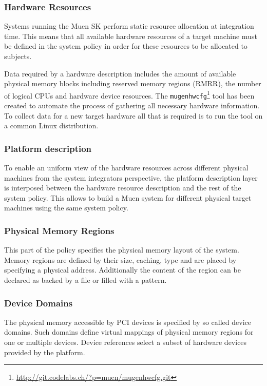 \documentclass[a4paper,twoside,titlepage]{article}
\begin{document}
\subsubsection{Hardware Resources}
Systems running the Muen SK perform static resource allocation at integration
time. This means that all available hardware resources of a target machine must
be defined in the system policy in order for these resources to be allocated to
subjects.

Data required by a hardware description includes the amount of available
physical memory blocks including reserved memory regions (RMRR), the number of
logical CPUs and hardware device resources. The
\texttt{mugenhwcfg}\footnote{\url{http://git.codelabs.ch/?p=muen/mugenhwcfg.git}}
tool has been created to automate the process of gathering all necessary
hardware information. To collect data for a new target hardware all that is
required is to run the tool on a common Linux distribution.

\subsubsection{Platform description}
To enable an uniform view of the hardware resources across different physical
machines from the system integrators perspective, the platform description layer
is interposed between the hardware resource description and the rest of the
system policy. This allows to build a Muen system for different physical target
machines using the same system policy.

\subsubsection{Physical Memory Regions}
This part of the policy specifies the physical memory layout of the system.
Memory regions are defined by their size, caching, type and are placed by
specifying a physical address. Additionally the content of the region can be
declared as backed by a file or filled with a pattern.

\subsubsection{Device Domains}
The physical memory accessible by PCI devices is specified by so called device
domains. Such domains define virtual mappings of physical memory regions for one
or multiple devices. Device references select a subset of hardware devices
provided by the platform.
\end{document}
